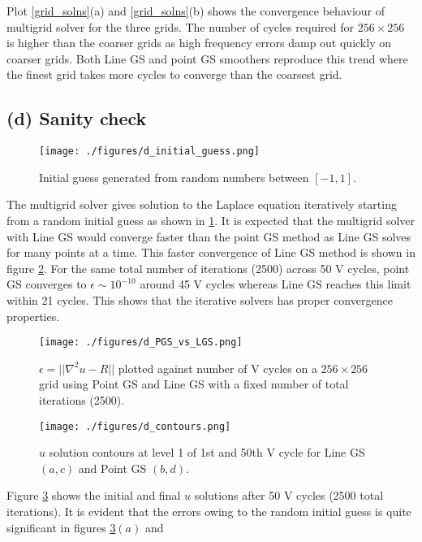 \documentclass[11pt]{report}
\begin{document}
Plot \ref{grid_solns}(a) and \ref{grid_solns}(b) shows the convergence behaviour of multigrid solver for the three grids. The 
number of cycles required for $256\times256$ is higher than the coarser grids as high frequency errors damp 
out quickly on coarser grids. Both Line GS and point GS smoothers reproduce this trend where the finest grid 
takes more cycles to converge than the coarsest grid.
\subsection{(d) Sanity check}
\begin{figure}[H]
	\begin{center}
		\texttt{[image: ./figures/d\_initial\_guess.png]}
	\end{center}
	\caption{Initial guess generated from random numbers between $[-1,1]$.}\label{init_guess}
\end{figure}
The multigrid solver gives solution to the Laplace equation iteratively starting from a random initial guess as 
shown in \ref{init_guess}. It is expected that the multigrid solver with Line GS would converge faster than the 
point GS method as Line GS solves for many points at a time. This faster convergence of Line GS method is shown in figure \ref{dfig}. For the same total number of iterations (2500) across 50 V cycles, point GS converges to $\epsilon\sim 10^{-10}$ around 45 V cycles whereas Line GS reaches this limit within 21 cycles. This shows that the iterative solvers has proper convergence properties.
\begin{figure}[H]
	\begin{center}
		\texttt{[image: ./figures/d\_PGS\_vs\_LGS.png]}
	\end{center}
\caption{$\epsilon=|\!|\nabla^2u-R|\!|$ plotted against number of V cycles on a $256\times 256$ grid using Point GS and Line GS with a fixed number of total iterations (2500).}\label{dfig}
\end{figure}
\begin{figure}[H]
	\begin{center}
		\texttt{[image: ./figures/d\_contours.png]}
	\end{center}
		\caption{$u$ solution contours at level 1 of 1st and 50th V cycle for Line GS $(a,c)$ and Point GS $(b,d)$.}\label{dcontours}
\end{figure}
Figure \ref{dcontours} shows the initial and final $u$ solutions after 50 V cycles (2500 total iterations). It is 
evident that the errors owing to the random initial guess is quite significant in figures \ref{dcontours}$(a)$ and 
\end{document}
